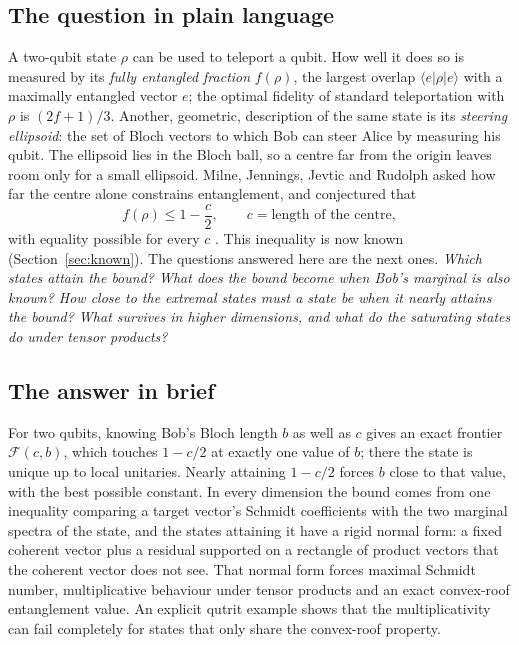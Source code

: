\documentclass[11pt,a4paper]{article}
\theoremstyle{remark}\newtheorem{remark}[theorem]{Remark}
\newcommand{\ket}[1]{\lvert #1\rangle}\newcommand{\bra}[1]{\langle #1\rvert}
\newcommand{\Fe}{\mathcal F}
\begin{document}
\subsection{The question in plain language}
A two-qubit state $\rho$ can be used to teleport a qubit. How well it does so
is measured by its \emph{fully entangled fraction} $f(\rho)$, the largest
overlap $\bra e\rho\ket e$ with a maximally entangled vector $e$; the optimal
fidelity of standard teleportation with $\rho$ is $(2f+1)/3$. Another, geometric, description of
the same state is its \emph{steering ellipsoid}: the set of Bloch vectors
to which Bob can steer Alice by measuring his qubit. The ellipsoid lies in
the Bloch ball, so a centre far from the origin leaves room only for a small
ellipsoid. Milne, Jennings, Jevtic and Rudolph
asked how far the centre alone constrains entanglement, and conjectured that
\[
 f(\rho)\le 1-\frac c2,\qquad c=\text{length of the centre},
\]
with equality possible for every $c$ \cite{milne2014}. This inequality is now
known (Section~\ref{sec:known}). The questions answered here are the next
ones. \emph{Which states attain the bound? What does the bound become when
Bob's marginal is also known? How close to the extremal states must a state
be when it nearly attains the bound? What survives in higher dimensions, and
what do the saturating states do under tensor products?}

\subsection{The answer in brief}
For two qubits, knowing Bob's Bloch length $b$ as well as $c$ gives an exact
frontier $\Fe(c,b)$, which touches $1-c/2$ at exactly one value of $b$; there
the state is unique up to local unitaries. Nearly attaining $1-c/2$ forces
$b$ close to that value, with the best possible constant. In every dimension
the bound comes from one inequality comparing a target vector's Schmidt
coefficients with the two marginal spectra of the state, and the states
attaining it have a rigid normal form: a fixed coherent vector plus a residual
supported on a rectangle of product vectors that the coherent vector does not
see. That normal form forces maximal Schmidt number, multiplicative behaviour
under tensor products and an exact convex-roof entanglement value. An
explicit qutrit example shows that the multiplicativity can fail completely
for states that only share the convex-roof property.
\end{document}
